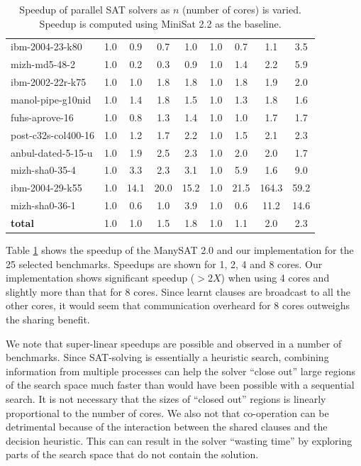 \documentclass[letterpaper, compsoc, conference]{IEEEtran}
\begin{document}
\begin{table}[htbp]
\begin{center}
\begin{tabular}{|l|c|c|c|c|c|c|c|c|}
        ibm-2004-23-k80                    &       1.0 &  0.9 &  0.7 &  1.0 &  1.0 &  0.7 &  1.1 &  3.5 \\
        mizh-md5-48-2                      &       1.0 &  0.2 &  0.3 &  0.9 &  1.0 &  1.4 &  2.2 &  5.9 \\
        ibm-2002-22r-k75                   &       1.0 &  1.0 &  1.8 &  1.8 &  1.0 &  1.8 &  1.9 &  2.0 \\
        manol-pipe-g10nid                  &       1.0 &  1.4 &  1.8 &  1.5 &  1.0 &  1.3 &  1.8 &  1.6 \\
        fuhs-aprove-16                     &       1.0 &  0.8 &  1.3 &  1.4 &  1.0 &  1.0 &  1.7 &  1.7 \\
        post-c32s-col400-16                &       1.0 &  1.2 &  1.7 &  2.2 &  1.0 &  1.5 &  2.1 &  2.3 \\
        anbul-dated-5-15-u                 &       1.0 &  1.9 &  2.5 &  2.3 &  1.0 &  2.0 &  2.0 &  1.7 \\
        mizh-sha0-35-4                     &       1.0 &  3.3 &  2.3 &  3.1 &  1.0 &  5.9 &  1.6 &  9.0 \\
        ibm-2004-29-k55                    &       1.0 & 14.1 & 20.0 & 15.2 &  1.0 & 21.5 &164.3 & 59.2 \\
        mizh-sha0-36-1                     &       1.0 &  0.6 &  1.0 &  3.9 &  1.0 &  0.6 & 11.2 & 14.6 \\
        \hline
        \textbf{total}                     &       1.0 &  1.0 &  1.5 &  1.8 &  1.0 &  1.1 &  2.0 &  2.3 \\
        \hline
    \end{tabular}
    \end{center}
    \caption{Speedup of parallel SAT solvers as $n$ (number of cores) is
    varied. Speedup is computed using MiniSat 2.2 as the baseline. }
    \label{tab:speedup}
\end{table}

Table \ref{tab:speedup} shows the speedup of the ManySAT 2.0 and our
implementation for the 25 selected benchmarks. Speedups are shown for 1, 2, 4
and 8 cores.  Our implementation shows significant speedup ($>2X$) when using 4
cores and slightly more than that for 8 cores. Since learnt clauses are
broadcast to all the other cores, it would seem that communication overheard
for 8 cores outweighs the sharing benefit. 

We note that super-linear speedups are possible and observed in a number of
benchmarks.  Since SAT-solving is essentially a heuristic search, combining
information from multiple processes can help the solver ``close out'' large
regions of the search space much faster than would have been possible with a
sequential search. It is not necessary that the sizes of ``closed out'' regions
is linearly proportional to the number of cores. We also not that co-operation
can be detrimental because of the interaction between the shared clauses and
the decision heuristic.  This can can result in the solver ``wasting time'' by
exploring parts of the search space that do not contain the solution.
\end{document}
